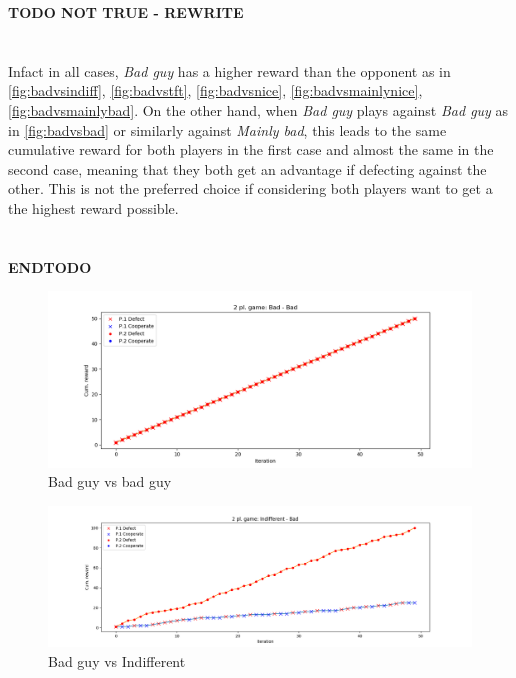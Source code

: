 \documentclass[journal,a4paper,10pt,twoside,draft]{IEEEtran}
\begin{document}
\textbf{TODO NOT TRUE - REWRITE}\\ \\ \\
Infact in all cases, \textit{Bad guy} has a higher reward than the opponent as in \autoref{fig:badvsindiff}, \autoref{fig:badvstft}, \autoref{fig:badvsnice}, \autoref{fig:badvsmainlynice}, \autoref{fig:badvsmainlybad}. 
On the other hand, when \textit{Bad guy} plays against \textit{Bad guy} as in \autoref{fig:badvsbad} or similarly against \textit{Mainly bad}, this leads to the same cumulative reward for both players in the first case and almost the same in the second case, meaning that they both get an advantage if defecting against the other. This is not the preferred choice if considering both players want to get a the highest reward possible.\\ \\ \\
\textbf{ENDTODO}
\begin{figure}
    \centering
    \includegraphics[width=1\columnwidth]{../img_v1/idp2p-rewards-Bad-Bad.png}
    \caption{Bad guy vs bad guy}
    \label{fig:badvsbad}
\end{figure}

\begin{figure}
    \centering
    \includegraphics[width=1\columnwidth]{../img_v1/idp2p-rewards-Indifferent-Bad.png}
    \caption{Bad guy vs Indifferent}
    \label{fig:badvsindiff}
\end{figure}
\end{document}
